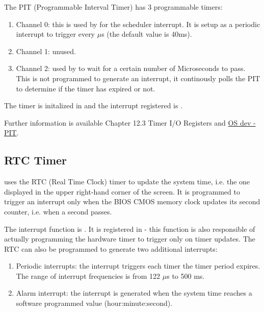 \begin{appendices}
The PIT (Programmable Interval Timer) has 3 programmable timers:
\begin{enumerate}
	\item Channel 0: this is used by \projectname for the scheduler interrupt. It is setup as a periodic interrupt to 
trigger every  $\mu$s (the default value is 40ms).

	\item Channel 1: unused.

	\item Channel 2: used by  to wait for a certain number of Microseconds to pass. This is not
programmed to generate an interrupt, it continously polls the PIT to determine if the timer has expired or not.
\end{enumerate}

The timer is initalized in  and the interrupt registered is .

Further information is available \cite{intelPch} Chapter 12.3 Timer I/O Registers and 
\href{http://wiki.osdev.org/Programmable_Interval_Timer}{OS dev - PIT}.

\subsection{RTC Timer}

\projectname uses the RTC (Real Time Clock) timer to update the system time, i.e. the one displayed in the upper right-hand
corner of the screen. It is programmed to trigger an interrupt only when the BIOS CMOS memory clock updates its second 
counter, i.e. when a second passes.

The interrupt function is . It is registered in  - this function is also
responsible of actually programming the hardware timer to trigger only on timer updates. The RTC can also be programmed
to generate two additional interrupts:
\begin{enumerate}
	\item Periodic interrupts: the interrupt triggers each timer the timer period expires. The range of interrupt
frequencies is from 122 $\mu$s to 500 ms.

	\item Alarm interrupt: the interrupt is generated when the system time reaches a software programmed value
(hour:minute:second).
\end{enumerate}


\end{appendices}
